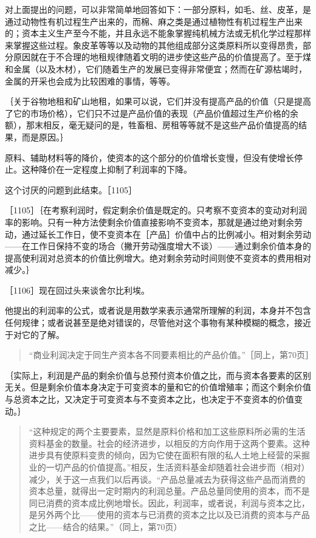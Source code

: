 对上面提出的问题，可以非常简单地回答如下：一部分原料，如毛、丝、皮革，是通过动物性有机过程生产出来的，而棉、麻之类是通过植物性有机过程生产出来的；资本主义生产至今不能，并且永远不能象掌握纯机械方法或无机化学过程那样来掌握这些过程。象皮革等等以及动物的其他组成部分这类原料所以变得昂贵，部分原因就在于不合理的地租规律随着文明的进步使这些产品的价值提高了。至于煤和金属（以及木材），它们随着生产的发展已变得非常便宜；然而在矿源枯竭时，金属的开采也会成为比较困难的事情，等等。

｛关于谷物地租和矿山地租，如果可以说，它们并没有提高产品的价值（只是提高了它的市场价格），它们只不过是产品价值的表现（产品价值超过生产价格的余额），那末相反，毫无疑问的是，牲畜租、房租等等就不是这些产品价值提高的结果，而是原因。｝

原料、辅助材料等的降价，使资本的这个部分的价值增长变慢，但没有使增长停止。这种降价在一定程度上抑制了利润率的下降。

这个讨厌的问题到此结束。［1105］

［1105］｛在考察利润时，假定剩余价值是既定的。只考察不变资本的变动对利润率的影响。只有一种方法使剩余价值直接影响不变资本，那就是通过绝对剩余劳动，通过延长工作日，使不变资本在［产品］价值中占的比例减小。相对剩余劳动——在工作日保持不变的场合（撇开劳动强度增大不谈）——通过剩余价值本身的提高使利润对总资本的价值比例增大。绝对剩余劳动时间则使不变资本的费用相对减少。｝


［1106］现在回过头来谈舍尔比利埃。

他提出的利润率的公式，或者说是用数学来表示通常所理解的利润，本身并不包含任何规律；或者说甚至是绝对错误的，尽管他对这个事物有某种模糊的概念，接近于对它的了解。

\begin{quote}{“商业利润决定于同生产资本各不同要素相比的产品价值。”［同上，第70页］}\end{quote}

｛实际上，利润是产品的剩余价值与总预付资本价值之比，而与资本各要素的区别无关。但是剩余价值本身决定于可变资本的量和它的价值增殖率；而这个剩余价值与总资本之比，又决定于可变资本与不变资本之比，也决定于不变资本的价值变动。｝

\begin{quote}{“这种规定的两个主要要素，显然是原料价格和加工这些原料所必需的生活资料基金的数量。社会的经济进步，以相反的方向作用于这两个要素。这种进步具有使原料变贵的倾向，因为它使在面积有限的私人土地上经营的采掘业的一切产品的价值提高。”相反，生活资料基金却随着社会进步而（相对）减少，关于这一点我们以后再谈。“产品总量减去为获得这些产品而消费的资本总量，就得出一定时期内的利润总量。产品总量同使用的资本，而不是同已消费的资本成比例地增长。因此，利润率，或者说，利润与资本之比，是另外两个比——使用的资本与已消费的资本之比以及已消费的资本与产品之比——结合的结果。”（同上，第70页）}\end{quote}

